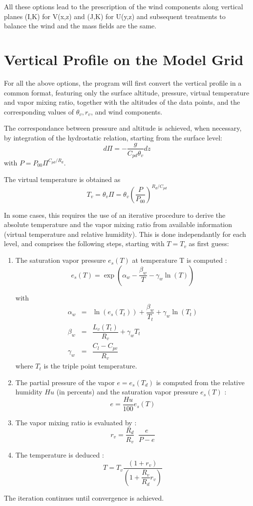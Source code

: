 All these options lead to the prescription of the wind components along vertical
planes (I,K) for V(x,z) and (J,K) for U(y,z) and subsequent treatments
to balance the wind and the mass fields are the same.

\section{Vertical Profile on the Model Grid}

For all the above options, the program will first convert the vertical profile
 in a common format, featuring only the surface altitude, pressure, virtual
temperature and vapor mixing ratio, together with the altitudes of the
data points, and the corresponding values of $\theta_v, r_v$, and wind
components.

The correspondance between pressure and altitude is achieved, when necessary,
by integration of the hydrostatic relation, starting from the surface level:
\begin{equation}
d \Pi = - \dfrac{g}{C_{pd} \theta_{v}}  dz
\end{equation}
with $P = P_{00} \Pi^{C_{pd}/R_{d}} $.

The virtual temperature is obtained as
\begin{equation}
T_{v} = \theta_{v} \Pi = \theta_{v} \left( \dfrac{P}{P_{00}} \right) ^{R_{d}/C_{pd}}
\end{equation}



In some cases, this requires the use of an iterative procedure
to derive the absolute temperature and the vapor mixing ratio from
available information (virtual temperature and relative humidity).
This is done independantly for each level, and
comprises the following steps, starting with $T=T_v$ as first guess:
\begin{enumerate}
\item The saturation vapor pressure $e_{s}(T)$ at temperature T is computed  :
$$
e_{s}(T) =  \exp\left( \alpha_{w} - \dfrac{\beta_{w}}{T} - \gamma_{w}
\ln (T)\right)
$$

with
\begin{eqnarray*}
\alpha_{w} & = &  \ln (e_{s}(T_{t}) ) + \dfrac{\beta_{w}}{T_{t}} + \gamma_{w}
\ln (T_{t}) \\
\beta_{w} & = & \dfrac{L_{v}(T_{t})}{R_{v}} + \gamma_{w} T_{t} \\
\gamma_{w} & = & \dfrac{C_{l}-C_{pv}}{R_{v}}
\end{eqnarray*}
where $T_t$ is the triple point temperature.

\item  The partial pressure of the vapor $e= e_{s}(T_d)$
is computed from the relative humidity $Hu$ (in percents) and the saturation
vapor pressure $e_{s}(T)$ :
$$
e= \dfrac{Hu}{100} e_{s}(T)
$$
\item  The vapor mixing ratio is evaluated by :
$$
r_{v} = \dfrac{R_{d}}{R_{v}} \;\; \dfrac{e}{P-e}
$$
\item   The temperature is deduced :
$$
T = T_{v} \dfrac{(1+r_{v})}{(1 + \dfrac{R_{v}}{R_{d}}r_{v})}
$$
\end{enumerate}
The iteration continues until convergence is achieved.

